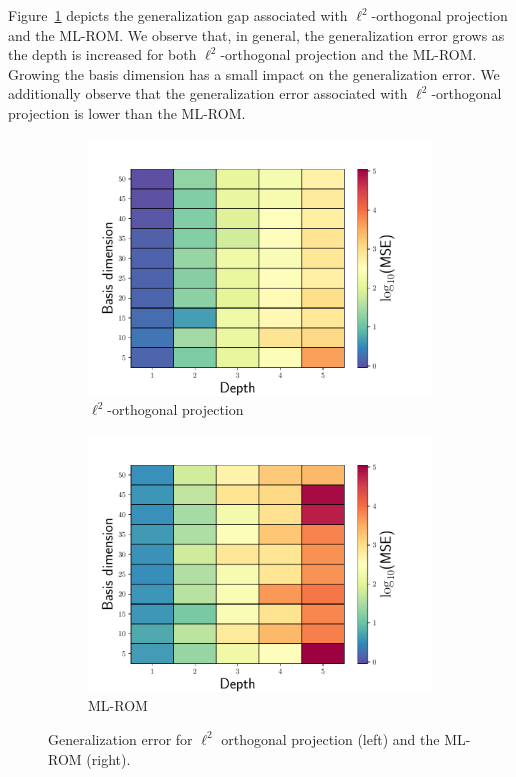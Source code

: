 \documentclass[3p,computermodern,10pt]{elsarticle}
\begin{document}
Figure~\ref{fig:burg_gen_gap} depicts the generalization gap associated with $\ell^2$-orthogonal projection and the ML-ROM. We observe that, in general, the generalization error grows as the depth is increased for both $\ell^2$-orthogonal projection and the ML-ROM. Growing the basis dimension has a small impact on the generalization error. We additionally observe that the generalization error associated with $\ell^2$-orthogonal projection is lower than the ML-ROM. 
\begin{figure}
\begin{center}
\begin{subfigure}[t]{0.49\textwidth}
\includegraphics[trim={0cm 0cm 0cm 0cm},clip,width=1.0\linewidth]{code/burgers/synapse_models/basis_study/gen_gap.pdf}
\caption{$\ell^2$-orthogonal projection}
\end{subfigure}
\begin{subfigure}[t]{0.49\textwidth}
\includegraphics[trim={0cm 0cm 0cm 0cm},clip,width=1.0\linewidth]{code/burgers/synapse_models/basis_study/gen_gap_ML.pdf}
\caption{ML-ROM}
\end{subfigure}
\caption{Generalization error for $\ell^2$ orthogonal projection (left) and the ML-ROM (right).}
\label{fig:burg_gen_gap}
\end{center}
\end{figure}
\end{document}
